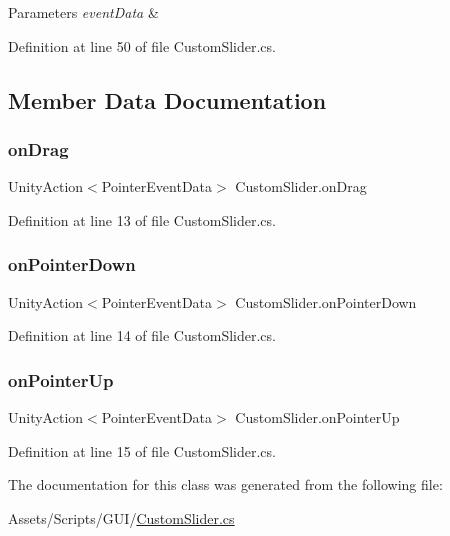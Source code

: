 \begin{DoxyParams}{Parameters}
{\em event\+Data} & \\
\hline
\end{DoxyParams}


Definition at line 50 of file Custom\+Slider.\+cs.



\subsection{Member Data Documentation}
\mbox{\label{class_custom_slider_a0dddc3818a2fb5ce0810f1fba19ad642}} 
\subsubsection{\texorpdfstring{on\+Drag}{onDrag}}
{\footnotesize\ttfamily Unity\+Action$<$Pointer\+Event\+Data$>$ Custom\+Slider.\+on\+Drag}



Definition at line 13 of file Custom\+Slider.\+cs.

\mbox{\label{class_custom_slider_ab857c76b5764b6a2b6978c9a33da2a2a}} 
\subsubsection{\texorpdfstring{on\+Pointer\+Down}{onPointerDown}}
{\footnotesize\ttfamily Unity\+Action$<$Pointer\+Event\+Data$>$ Custom\+Slider.\+on\+Pointer\+Down}



Definition at line 14 of file Custom\+Slider.\+cs.

\mbox{\label{class_custom_slider_af31b3817d4037e23991320a0674d09d2}} 
\subsubsection{\texorpdfstring{on\+Pointer\+Up}{onPointerUp}}
{\footnotesize\ttfamily Unity\+Action$<$Pointer\+Event\+Data$>$ Custom\+Slider.\+on\+Pointer\+Up}



Definition at line 15 of file Custom\+Slider.\+cs.



The documentation for this class was generated from the following file\+:\begin{DoxyCompactItemize}
\item 
Assets/\+Scripts/\+G\+U\+I/\mbox{\hyperlink{_custom_slider_8cs}{Custom\+Slider.\+cs}}\end{DoxyCompactItemize}
